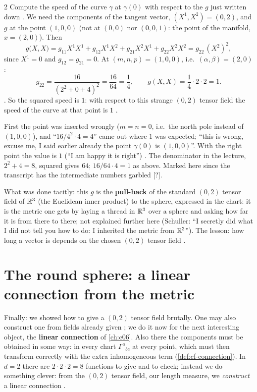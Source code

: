 \begin{paracol}{2}
Compute the speed of the curve $\gamma$ at $\gamma(0)$ with respect to the $g$ just written down . We need the components of the tangent vector, $(X^1,X^2)=(0,2)$, and
$g$ at the point $(1,0,0)$ (not at $(0,0)$ nor $(0,0,1)$: the point of the manifold, $x=(2,0)$). Then
\[
  g\bigl(X,X\bigr)=g_{11}X^1X^1+g_{12}X^1X^2+g_{21}X^2X^1+g_{22}X^2X^2=g_{22}\,(X^2)^2,
\]
since $X^1=0$ and $g_{12}=g_{21}=0$. At $(m,n,p)=(1,0,0)$, i.e.\ $(\alpha,\beta)=(2,0)$:
\[
  g_{22}=\frac{16}{(2^2+0+4)^2}=\frac{16}{64}=\frac14,\qquad g(X,X)=\frac14\cdot 2\cdot2=1 .
\]
. So the squared speed is $1$: with respect to this strange $(0,2)$ tensor field the speed of the curve at that point is $1$ .
\begin{coursenote}
First the point was inserted wrongly ($m=n=0$, i.e.\ the north pole instead of $(1,0,0)$), and ``$16/4^2\cdot4=4$'' came out where $1$ was expected; ``this is wrong, excuse me,
I said earlier already the point $\gamma(0)$ is $(1,0,0)$''. With the right point the value is $1$ (``I am happy it is right'') .
The denominator in the lecture, $2^2+4=8$, squared gives $64$; $16/64\cdot4=1$ as above. Marked here since the transcript has the intermediate numbers garbled [?].
\end{coursenote}
What was done tacitly: this $g$ is the \textbf{pull-back} of the standard $(0,2)$ tensor field of $\mathbb{R}^3$ (the Euclidean inner product) to the sphere, expressed in the chart: it is the metric one gets by
laying a thread in $\mathbb{R}^3$ over a sphere and asking how far it is from there to there; not explained further here (Schuller: ``I secretly did what I did not tell you how to do: I inherited the
metric from $\mathbb{R}^3$''). The lesson: how long a vector is depends on the chosen $(0,2)$ tensor field .

\section{The round sphere: a linear connection from the metric}\label{sec:sp-round}

Finally: we showed how to give a $(0,2)$ tensor field brutally. One may also construct one from fields already given ; we do it now for the next interesting object, the \textbf{linear connection} of \cref{ch:c06}.
Also there the components must be obtained in some way: in every chart $\Gamma^a{}_{bc}$ at every point, which must then transform correctly with the extra inhomogeneous term (\cref{def:cf-connection}).
In $d=2$ there are $2\cdot2\cdot2=8$ functions to give and to check; instead we do something clever: from the $(0,2)$ tensor field, our length measure, we \emph{construct} a linear connection
.


\end{paracol}
